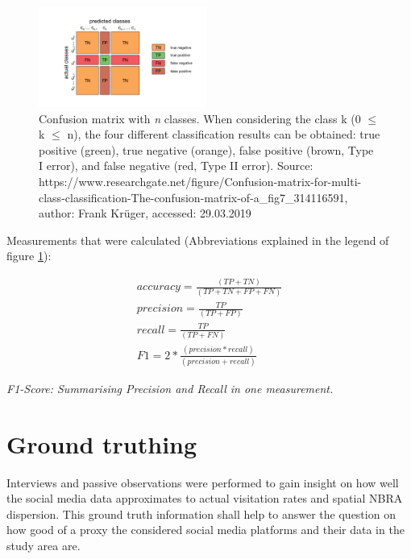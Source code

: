 \begin{figure} %
    \centerline{\includegraphics[trim={0 0 0 0},clip,width=0.49\textwidth]{img/Confusion_matrix_edited}}
  \caption{Confusion matrix with \textit{n} classes. When considering the class k (0 $\le$ k $\le$ n), the four different classification results can be obtained: true positive (green), true negative (orange), false positive (brown, Type I error), and false negative (red, Type II error). Source: https://www.researchgate.net/figure/Confusion-matrix-for-multi-class-classification-The-confusion-matrix-of-a\_fig7\_314116591, author: Frank Kr\"uger, accessed: 29.03.2019}
  \label{fig:confusion_matrix_illustration}
\end{figure}

Measurements that were calculated (Abbreviations explained in the legend of figure \ref{fig:confusion_matrix_illustration}):

\begin{gather*}
accuracy = \frac{(TP+TN)}{(TP+TN+FP+FN)}\\
precision = \frac{TP}{(TP+FP)}\\
recall = \frac{TP}{(TP+FN)}\\
F1 = 2*\frac{(precision*recall)}{(precision+recall)}
\end{gather*}

\textit{F1-Score: Summarising Precision and Recall in one measurement.}

\clearpage

\section{Ground truthing} \label{groud_truthing}
Interviews and passive observations were performed to gain insight on how well the social media data approximates to actual visitation rates and spatial NBRA dispersion. This ground truth information shall help to answer the question on how good of a proxy the considered social media platforms and their data in the study area are.

